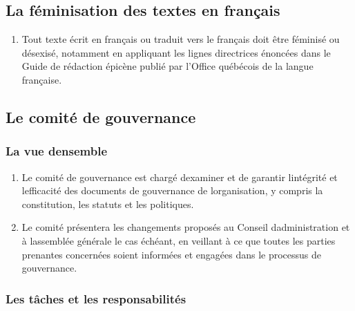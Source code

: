 \subsection{La féminisation des textes en français}
\label{la-feminisation-des-textes-en-francais}

\begin{enumerate}
 \item
  Tout texte écrit en français ou traduit vers le français doit être féminisé ou désexisé, notamment en appliquant les lignes directrices énoncées dans le Guide de rédaction épicène publié par l'Office québécois de la langue française.
\end{enumerate}

\subsection{Le comité de gouvernance}
\label{le-comite-de-gouvernance}

\subsubsection{La vue d\textquotesingle ensemble}
\label{la-vue-densemble-4}

\begin{enumerate}
 \item
  Le comité de gouvernance est chargé d\textquotesingle examiner et de garantir l\textquotesingle intégrité et l\textquotesingle efficacité des documents de gouvernance de l\textquotesingle organisation, y compris la constitution, les statuts et les politiques.
 \item
  Le comité présentera les changements proposés au Conseil d\textquotesingle administration et à l\textquotesingle assemblée générale le cas échéant, en veillant à ce que toutes les parties prenantes concernées soient informées et engagées dans le processus de gouvernance.
\end{enumerate}

\subsubsection{Les tâches et les responsabilités}
\label{les-taches-et-les-responsabilites}

